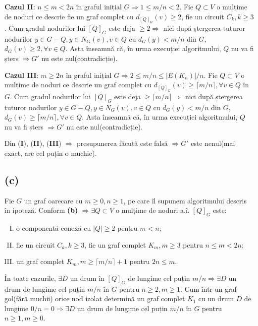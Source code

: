 \documentclass[a4paper,12pt]{article}
\begin{document}
\textbf{Cazul II}: $n \leq m <2n$ în graful inițial $G \Rightarrow 1 \leq m/n < 2$. Fie $Q \subset V$ o mulțime de noduri ce descrie fie un graf complet cu $d_{[Q]_G}(v) \geq 2$, fie un circuit $C_k,k \geq 3$. Cum gradul nodurilor lui  $[Q]_G$ este deja $\geq 2 \Rightarrow$ nici după ștergerea tuturor nodurilor $y \in G-Q, y \in N_G(v), v \in Q$ cu $d_G(y) < m/n$ din $G$, $d_G(v) \geq 2, \forall v \in Q$. Asta înseamnă că, în urma execuției algoritmului, $Q$ nu va fi șters $\Rightarrow G'$ nu este nul(contradicție).

\textbf{Cazul III}: $m \geq 2n$ în graful inițial $G \Rightarrow 2 \leq m/n \leq |E(K_n)|/n$. Fie $Q \subset V$ o mulțime de noduri ce descrie un graf complet cu $d_{[Q]_G}(v) \geq \lceil m/n \rceil, \forall v \in Q$ în $G$. Cum gradul nodurilor lui $[Q]_G$ este deja $\geq \lceil m/n \rceil \Rightarrow$ nici după ștergerea tuturor nodurilor $y \in G-Q, y \in N_G(v), v \in Q$ cu $d_G(y) < m/n$ din $G$, $d_G(v) \geq \lceil m/n \rceil, \forall v \in Q$. Asta înseamnă că, în urma execuției algoritmului, $Q$ nu va fi șters $\Rightarrow G'$ nu este nul(contradicție).

Din (\textbf{I}), (\textbf{II}), (\textbf{III}) $\Rightarrow$ presupunerea făcută este falsă $\Rightarrow G'$ este nenul(mai exact, are cel puțin o muchie).

\subsection{(c)}

Fie $G$ un graf oarecare cu $m \geq 0, n \geq 1$, pe care îl supunem algoritmului descris în ipoteză. Conform \textbf{(b)} $\Rightarrow \exists Q \subset V$ o mulțime de noduri a.î. $[Q]_G$ este:
\begin{enumerate}[I.]
	\item o componentă conexă cu $|Q|\geq2$ pentru $m<n$;
	\item fie un circuit $C_k, k\geq 3$, fie un graf complet $K_m, m\geq3$ pentru $n\leq m <2n$;
	\item un graf complet $K_m,m\geq \lceil m/n \rceil +1$ pentru $2n\leq m$.
\end{enumerate}
În toate cazurile, $\exists D$ un drum în $[Q]_G$ de lungime cel puțin $m/n \Rightarrow \exists D$ un drum de lungime cel puțin $m/n$ în $G$ pentru $n \geq 2, m\geq 1$. Cum într-un graf gol(fără muchii) orice nod izolat determină un graf complet $K_1$ cu un drum $D$ de lungime $0/n = 0 \Rightarrow \exists D$ un drum de lungime cel puțin $m/n$ în $G$ pentru $n \geq 1, m\geq 0$.
\end{document}
